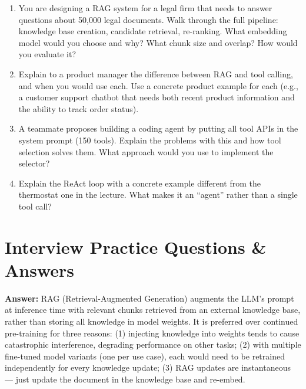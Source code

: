 \documentclass[11pt, a4paper]{article}
\begin{document}
\begin{enumerate}[leftmargin=2em]
  \item You are designing a RAG system for a legal firm that needs to answer questions about 50,000 legal documents. Walk through the full pipeline: knowledge base creation, candidate retrieval, re-ranking. What embedding model would you choose and why? What chunk size and overlap? How would you evaluate it?

  \item Explain to a product manager the difference between RAG and tool calling, and when you would use each. Use a concrete product example for each (e.g., a customer support chatbot that needs both recent product information and the ability to track order status).

  \item A teammate proposes building a coding agent by putting all tool APIs in the system prompt (150 tools). Explain the problems with this and how tool selection solves them. What approach would you use to implement the selector?

  \item Explain the ReAct loop with a concrete example different from the thermostat one in the lecture. What makes it an ``agent'' rather than a single tool call?
\end{enumerate}

\newpage
\section{Interview Practice Questions \& Answers}

\begin{notebox}
\textbf{Answer:} RAG (Retrieval-Augmented Generation) augments the LLM's prompt at inference time with relevant chunks retrieved from an external knowledge base, rather than storing all knowledge in model weights. It is preferred over continued pre-training for three reasons: (1) injecting knowledge into weights tends to cause catastrophic interference, degrading performance on other tasks; (2) with multiple fine-tuned model variants (one per use case), each would need to be retrained independently for every knowledge update; (3) RAG updates are instantaneous --- just update the document in the knowledge base and re-embed.
\end{notebox}
\end{document}
